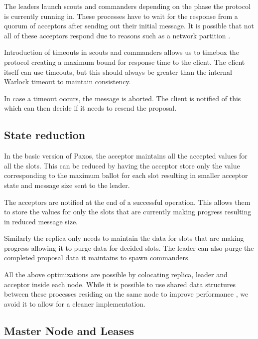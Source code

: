 The leaders launch scouts and commanders depending on the phase the protocol
is currently running in. These processes have to wait for the response from
a quorum of acceptors after sending out their initial message. It is possible
that not all of these acceptors respond due to reasons such as a network
partition%
.

Introduction of timeouts in scouts and commanders allows us to timebox the
protocol creating a maximum bound for response time to the client. The client
itself can use timeouts, but this should always be greater than the internal
Warlock timeout to maintain consistency.

In case a timeout occurs, the message is aborted. The client is notified of
this which can then decide if it needs to resend the proposal.

\subsection{State reduction}

In the basic version of Paxos, the acceptor maintains all the accepted values
for all the slots. This can be reduced by having the acceptor store only the
value corresponding to the maximum ballot for each slot resulting in smaller
acceptor state and  message size sent to the leader.

The acceptors are notified at the end of a successful operation. This allows
them to store the values for only the slots that are currently making
progress resulting in reduced  message size.

Similarly the replica only needs to maintain the data for slots that are
making progress allowing it to purge data for decided slots. The leader can
also purge the completed proposal data it maintains to spawn commanders.

All the above optimizations are possible by colocating replica, leader
and acceptor inside each node. While it is possible to use shared
data structures between these processes residing on the same node to improve
performance , we avoid it to allow for a cleaner implementation.

\subsection{Master Node and Leases}
\label{section:a.n.d.lease}

